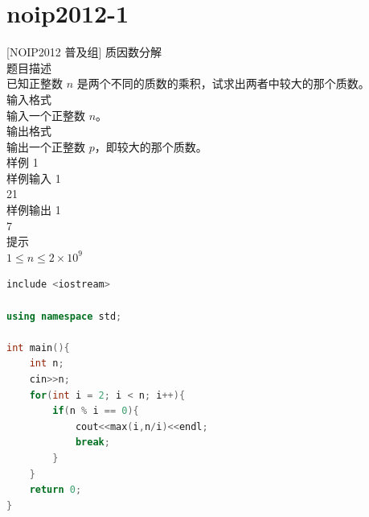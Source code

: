 \documentclass[12pt,twiside,a4paper]{ctexbook}
\numberwithin{chapter}{part}
\begin{document}
\section{noip2012-1}
 [NOIP2012 普及组] 质因数分解\\
 题目描述\\
已知正整数 $n$ 是两个不同的质数的乘积，试求出两者中较大的那个质数。\\
 输入格式\\
输入一个正整数 $n$。\\
 输出格式\\
输出一个正整数 $p$，即较大的那个质数。\\
 样例 1\\
 样例输入 1\\
21\\
 样例输出 1\\
7\\
 提示\\
$1 \le n\le 2\times 10^9$
\begin{lstlisting}[language=C++,breaklines=true]
include <iostream>

using namespace std;

int main(){
	int n;
	cin>>n;
	for(int i = 2; i < n; i++){
		if(n % i == 0){
			cout<<max(i,n/i)<<endl;
			break;
		}
	}
	return 0;
}
\end{lstlisting}
\end{document}
